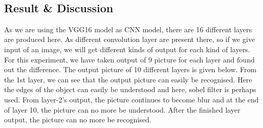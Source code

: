 \documentclass{article}
\begin{document}
{\begin{lstlisting}[language=Python, caption=Code for using pre trained model(VGG16)]
    \end{lstlisting}
    \\
    \subsection{Result & Discussion}{
        As we are using the VGG16 model as CNN model, there are 16 different layers are produced here. As different convolution layer are present there, so if we give input of an image, we will get different kinds of output for each kind of layers. For this experiment, we have taken output of 9 picture for each layer and found out the difference. The output picture of 10 different layers is given below. From the 1st layer, we can see that the output picture can easily be recognised. Here the edges of the object can easily be understood and here, sobel filter is perhaps used. From layer-2's output, the picture continues to become blur and at the end of layer 10, the picture can no more be understood. After the finished layer output, the picture can no more be recognised.
        
}}
\end{document}
